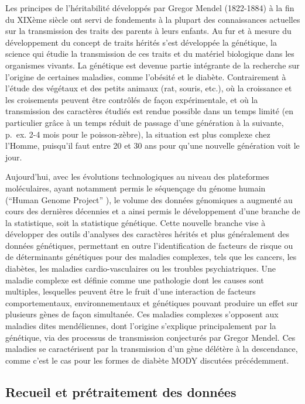 \documentclass[11pt,a4paper,notrimn]{krantz}
\theoremstyle{definition}
\theoremstyle{definition}
\theoremstyle{remark}
\begin{document}
Les principes de l'héritabilité développés par Gregor Mendel (1822-1884)
à la fin du XIXème siècle ont servi de fondements à la plupart des
connaissances actuelles sur la transmission des traits des parents à
leurs enfants. Au fur et à mesure du développement du concept de traits
hérités s'est développée la génétique, la science qui étudie la
transmission de ces traits et du matériel biologique dans les organismes
vivants. La génétique est devenue partie intégrante de la recherche sur
l'origine de certaines maladies, comme l'obésité et le diabète.
Contrairement à l'étude des végétaux et des petits animaux (rat, souris,
etc.), où la croissance et les croisements peuvent être contrôlés de
façon expérimentale, et où la transmission des caractères étudiés est
rendue possible dans un temps limité (en particulier grâce à un temps
réduit de passage d'une génération à la suivante, p.~ex. 2-4 mois pour
le poisson-zèbre), la situation est plus complexe chez l'Homme,
puisqu'il faut entre 20 et 30 ans pour qu'une nouvelle génération voit
le jour.

Aujourd'hui, avec les évolutions technologiques au niveau des
plateformes moléculaires, ayant notamment permis le séquençage du génome
humain (``Human Genome Project'' \citep{sawicki_human_1993}), le volume
des données génomiques a augmenté au cours des dernières décennies et a
ainsi permis le développement d'une branche de la statistique, soit la
statistique génétique. Cette nouvelle branche vise à développer des
outils d'analyses des caractères hérités et plus généralement des
données génétiques, permettant en outre l'identification de facteurs de
risque ou de déterminants génétiques pour des maladies complexes, tels
que les cancers, les diabètes, les maladies cardio-vasculaires ou les
troubles psychiatriques. Une maladie complexe est définie comme une
pathologie dont les causes sont multiples, lesquelles peuvent être le
fruit d'une interaction de facteurs comportementaux, environnementaux et
génétiques pouvant produire un effet sur plusieurs gènes de façon
simultanée. Ces maladies complexes s'opposent aux maladies dites
mendéliennes, dont l'origine s'explique principalement par la génétique,
via des processus de transmission conjecturés par Gregor Mendel. Ces
maladies se caractérisent par la transmission d'un gène délétère à la
descendance, comme c'est le cas pour les formes de diabète MODY
discutées précédemment.

\subsection{Recueil et prétraitement des
données}\label{recueil-et-pretraitement-des-donnees}
\end{document}

